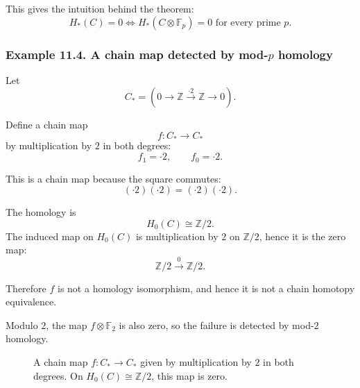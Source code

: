 \documentclass[12pt,a4paper]{article}
\theoremstyle{notespace}
\begin{document}
This gives the intuition behind the theorem:
\[
H_*(C)=0
\iff
H_*(C\otimes \mathbb F_p)=0
\text{ for every prime }p.
\]

\subsubsection*{Example 11.4. A chain map detected by mod-\(p\) homology}

Let
\[
C_*=
\left(
0
\longrightarrow
\mathbb Z
\xrightarrow{\cdot 2}
\mathbb Z
\longrightarrow
0
\right).
\]

Define a chain map
\[
f:C_*\to C_*
\]
by multiplication by \(2\) in both degrees:
\[
f_1=\cdot 2,
\qquad
f_0=\cdot 2.
\]

This is a chain map because the square commutes:
\[
(\cdot 2)(\cdot 2)=(\cdot 2)(\cdot 2).
\]

The homology is
\[
H_0(C)\cong \mathbb Z/2.
\]
The induced map on \(H_0(C)\) is multiplication by \(2\) on \(\mathbb Z/2\), hence it is the zero map:
\[
\mathbb Z/2
\xrightarrow{0}
\mathbb Z/2.
\]

Therefore \(f\) is not a homology isomorphism, and hence it is not a chain homotopy equivalence.

Modulo \(2\), the map \(f\otimes \mathbb F_2\) is also zero, so the failure is detected by mod-\(2\) homology.

\begin{figure}[htbp]
	\centering
	\caption{A chain map \(f:C_*\to C_*\) given by multiplication by \(2\) in both degrees. On \(H_0(C)\cong \mathbb Z/2\), this map is zero.}
\end{figure}
\end{document}
